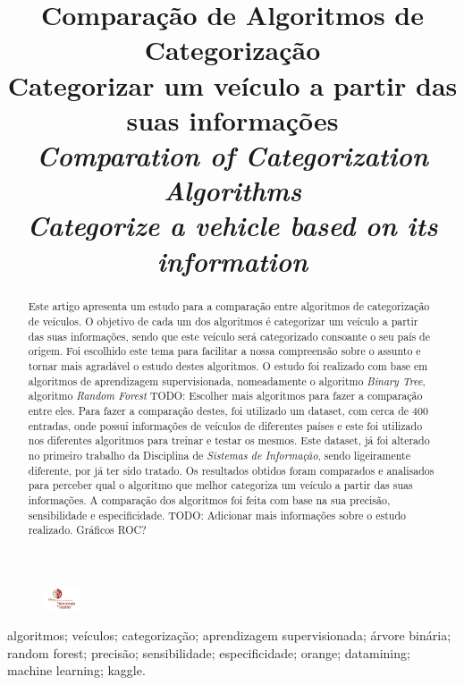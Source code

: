 \documentclass[conference]{IEEEtran}
\title{Comparação de Algoritmos de Categorização \\ \large Categorizar um veículo a partir das suas informações \\
\textit{Comparation of Categorization Algorithms \\ \large Categorize a vehicle based on its information}}
\author{
\IEEEauthorblockN{Martinho Caeiro - 23917 || Paulo Abade - 23919}
\IEEEauthorblockA{
    Instituto Politécnico de Beja\\
    Escola Superior de Tecnologia e Gestão\\
    Beja, Portugal\\
    23917@stu.ipbeja.pt || 23919@stu.ipbeja.pt
}
}
\begin{document}
\maketitle
\begin{figure}[!ht]
    \centering
    \includegraphics[width=0.1\textwidth]{Resources/Logo/IPBejaESTIG.jpg}
\end{figure}

\begin{abstract}
Este artigo apresenta um estudo para a comparação entre algoritmos de categorização de veículos. O objetivo de cada um dos 
algoritmos é categorizar um veículo a partir das suas informações, sendo que este veículo será categorizado consoante o seu 
país de origem. Foi escolhido este tema para facilitar a nossa compreensão sobre o assunto e tornar mais agradável o estudo
destes algoritmos. O estudo foi realizado com base em algoritmos de aprendizagem supervisionada, nomeadamente o algoritmo
\textit{Binary Tree}, algoritmo \textit{Random Forest} TODO: Escolher mais algoritmos para fazer a comparação entre eles. 
Para fazer a comparação destes, foi utilizado um dataset, com cerca de 400 entradas, onde possui informações de veículos de 
diferentes países e este foi utilizado nos diferentes algoritmos para treinar e testar os mesmos. Este dataset, já foi alterado 
no primeiro trabalho da Disciplina de \textit{Sistemas de Informação}, sendo ligeiramente diferente, por já ter sido tratado. 
Os resultados obtidos foram comparados e analisados para perceber qual o algoritmo que melhor categoriza um veículo a partir das 
suas informações. A comparação dos algoritmos foi feita com base na sua precisão, sensibilidade e especificidade. TODO: Adicionar 
mais informações sobre o estudo realizado. Gráficos ROC?
\end{abstract}

\begin{IEEEkeywords}
algoritmos; veículos; categorização; aprendizagem supervisionada; árvore binária; random forest; precisão; sensibilidade; especificidade;
orange; datamining; machine learning; kaggle.
\end{IEEEkeywords}

\end{document}
